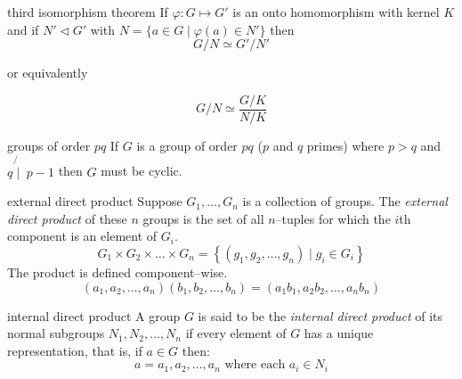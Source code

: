 \documentclass[avery5371,grid]{flashcards}
\begin{document}
\begin{flashcard}[Theorem]{third isomorphism theorem}
If $\varphi : G \mapsto G'$ is an onto homomorphism with kernel $K$ and
if $N' \lhd G'$ with 
$N = \lbrace a \in G \mid \varphi (a) \in N' \rbrace$ then
\begin{equation*}
G/N \simeq G'/N'
\end{equation*}
\begin{center}
or equivalently
\end{center}
\begin{equation*}
G/N \simeq \frac{G/K}{N/K}
\end{equation*}
\end{flashcard}

\begin{flashcard}[Theorem]{groups of order $pq$}
If $G$ is a group of order $pq$ ($p$ and $q$ primes) where
$p > q$ and $q \not{\mid} \; p-1$ then $G$ must be cyclic.
\end{flashcard}

\begin{flashcard}[Definition]{external direct product}
Suppose $G_{1},\ldots,G_{n}$ is a collection of groups.  The
\textit{external direct product} of these $n$ groups is the set
of all $n$--tuples for which the $i$th component is an element of
$G_{i}$.
\begin{equation*}
G_{1}\times G_{2}\times \ldots\times G_{n} =
\left\lbrace \left( g_{1},g_{2},\ldots,g_{n}\right)
\mid g_{i} \in G_{i}\right\rbrace 
\end{equation*}
The product is defined component--wise.
\begin{equation*}
\left(a_{1},a_{2},\ldots,a_{n} \right)
\left(b_{1},b_{2},\ldots,b_{n}  \right) =
\left( a_{1}b_{1},a_{2}b_{2},\ldots,a_{n}b_{n} \right) 
\end{equation*}
\end{flashcard}

\begin{flashcard}[Definition]{internal direct product}
A group $G$ is said to be the \textit{internal direct product}
of its normal subgroups $N_{1},N_{2},\ldots,N_{n}$ if every element of
$G$ has a unique representation, that is, if $a \in G$ then:
\begin{equation*}
a = a_{1},a_{2},\ldots,a_{n}  \text{ where each } a_{i} \in N_{i}
\end{equation*}
\end{flashcard}
\end{document}
